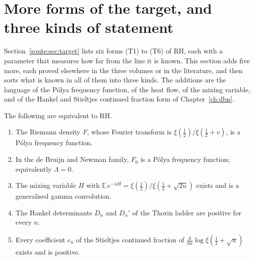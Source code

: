 \ifdefined\computation\else\theoremstyle{sc}\newtheorem{computation}[theorem]{Computation}\theoremstyle{scr}\fi
\ifdefined\openproblem\else\theoremstyle{sc}\newtheorem{openproblem}[theorem]{Open problem}\theoremstyle{scr}\fi
\ifdefined\conjecture\else\theoremstyle{sc}\newtheorem{conjecture}[theorem]{Conjecture}\theoremstyle{scr}\fi
\label{ch:pathdetail}

\section{More forms of the target, and three kinds of statement}\label{d:sec:kinds}

Section~\ref{route:sec:target} lists six forms (T1) to (T6) of RH, each with a parameter that measures how far from the line it is known. This section adds five more, each proved elsewhere in the three volumes or in the literature, and then sorts what is known in all of them into three kinds. The additions are the language of the Pólya frequency function, of the heat flow, of the mixing variable, and of the Hankel and Stieltjes continued fraction form of Chapter~\ref{ch:dbn}.

\begin{theorem}\label{d:thm:forms}
The following are equivalent to RH.
\begin{enumerate}
\item[(T7)] The Riemann density $F$, whose Fourier transform is $\xi(\frac12)/\xi(\frac12+v)$, is a Pólya frequency function.
\item[(T8)] In the de Bruijn and Newman family, $F_0$ is a Pólya frequency function; equivalently $\Lambda=0$.
\item[(T9)] The mixing variable $H$ with $\mathbb E\,e^{-uH}=\xi(\frac12)/\xi(\frac12+\sqrt{2u})$ exists and is a generalised gamma convolution.
\item[(T10)] The Hankel determinants $D_n$ and $D_n'$ of the Thorin ladder are positive for every $n$.
\item[(T11)] Every coefficient $c_n$ of the Stieltjes continued fraction of $\frac{\mathrm d}{\mathrm du}\log\xi(\frac12+\sqrt u)$ exists and is positive.
\end{enumerate}
\end{theorem}

